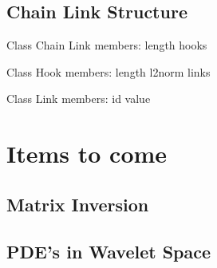 \documentclass[11pt]{article}
\begin{document}
\newpage
\subsection {Chain Link Structure}
Class Chain Link 
members:
length 
hooks

Class Hook 
members:
length
l2norm
links 

Class Link
members: 
id
value

\newpage

\section {Items to come}
\subsection {Matrix Inversion}
\subsection {PDE's in Wavelet Space}

 
\end{document}
